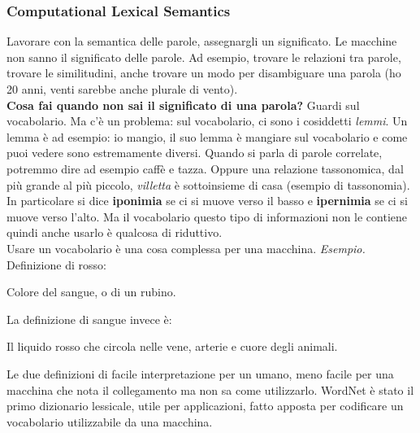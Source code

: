 \subsubsection{Computational Lexical Semantics}
Lavorare con la semantica delle parole, assegnargli un significato. Le macchine non sanno il significato delle parole. Ad esempio, trovare le relazioni tra parole, trovare le similitudini, anche trovare un modo per disambiguare una parola (ho 20 anni, venti sarebbe anche plurale di vento).
\\
\textbf{Cosa fai quando non sai il significato di una parola?} Guardi sul vocabolario. Ma c'è un problema: sul vocabolario, ci sono i cosiddetti \textit{lemmi}. Un lemma è ad esempio: io mangio, il suo lemma è mangiare sul vocabolario e come puoi vedere sono estremamente diversi. Quando si parla di parole correlate, potremmo dire ad esempio caffè e tazza. Oppure una relazione tassonomica, dal più grande al più piccolo, \textit{villetta} è sottoinsieme di casa (esempio di tassonomia). In particolare si dice \textbf{iponimia} se ci si muove verso il basso e \textbf{ipernimia} se ci si muove verso l'alto. Ma il vocabolario questo tipo di informazioni non le contiene quindi anche usarlo è qualcosa di riduttivo. 
\\
Usare un vocabolario è una cosa complessa per una macchina. \textit{Esempio.} Definizione di rosso:
\begin{center}
    Colore del sangue, o di un rubino.
\end{center}
La definizione di sangue invece è:
\begin{center}
    Il liquido rosso che circola nelle vene, arterie e cuore degli animali.
\end{center}
Le due definizioni di facile interpretazione per un umano, meno facile per una macchina che nota il collegamento ma non sa come utilizzarlo. WordNet è stato il primo dizionario lessicale, utile per applicazioni, fatto apposta per codificare un vocabolario utilizzabile da una macchina. 

\newpage

